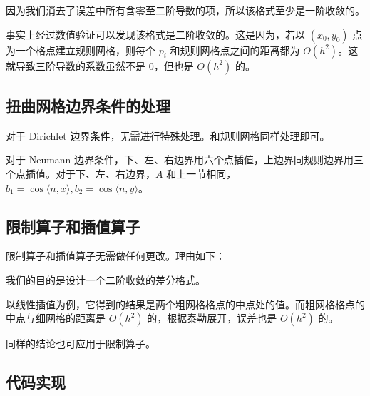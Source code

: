 \documentclass{ctexart}
\begin{document}
因为我们消去了误差中所有含零至二阶导数的项，所以该格式至少是一阶收敛的。

事实上经过数值验证可以发现该格式是二阶收敛的。这是因为，若以 $(x_0,y_0)$ 点为一个格点建立规则网格，则每个 $p_i$ 和规则网格点之间的距离都为 $O(h^2)$。这就导致三阶导数的系数虽然不是 $0$，但也是 $O(h^2)$ 的。

\subsection{扭曲网格边界条件的处理}

对于 Dirichlet 边界条件，无需进行特殊处理。和规则网格同样处理即可。

对于 Neumann 边界条件，下、左、右边界用六个点插值，上边界同规则边界用三个点插值。对于下、左、右边界，$A$ 和上一节相同，$b_1 = \cos\langle n,x\rangle,b_2 = \cos\langle n,y\rangle$。

\subsection{限制算子和插值算子}

限制算子和插值算子无需做任何更改。理由如下：

我们的目的是设计一个二阶收敛的差分格式。

以线性插值为例，它得到的结果是两个粗网格格点的中点处的值。而粗网格格点的中点与细网格的距离是 $O(h^2)$ 的，根据泰勒展开，误差也是 $O(h^2)$ 的。

同样的结论也可应用于限制算子。

\subsection{代码实现}
\end{document}
